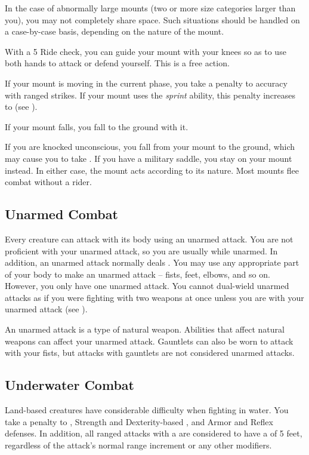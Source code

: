             In the case of abnormally large mounts (two or more size categories larger than you), you may not completely share space. Such situations should be handled on a case-by-case basis, depending on the nature of the mount.

             With a  5 Ride check, you can guide your mount with your knees so as to use both hands to attack or defend yourself. This is a free action.

            If your mount is moving in the current phase, you take a  penalty to accuracy with ranged strikes.
            If your mount uses the \textit{sprint} ability, this penalty increases to  (see ).

             If your mount falls, you fall to the ground with it.

             If you are knocked unconscious, you fall from your mount to the ground, which may cause you to take .
            If you have a military saddle, you stay on your mount instead.
            In either case, the mount acts according to its nature.
            Most mounts flee combat without a rider.

        \subsection{Unarmed Combat}\label{Unarmed Combat}
            Every creature can attack with its body using an unarmed attack.
            You are not proficient with your unarmed attack, so you are usually  while unarmed.
            In addition, an unarmed attack normally deals .
            You may use any appropriate part of your body to make an unarmed attack -- fists, feet, elbows, and so on.
            However, you only have one unarmed attack.
            You cannot dual-wield unarmed attacks as if you were fighting with two weapons at once unless you are  with your unarmed attack (see ).

            An unarmed attack is a type of natural weapon.
            Abilities that affect natural weapons can affect your unarmed attack.
            Gauntlets can also be worn to attack with your fists, but attacks with gauntlets are not considered unarmed attacks.

        \subsection{Underwater Combat}\label{Underwater Combat}
            Land-based creatures have considerable difficulty when fighting in water.
            You take a  penalty to , Strength and Dexterity-based , and Armor and Reflex defenses.
            In addition, all ranged attacks with a  are considered to have a  of 5 feet, regardless of the attack's normal range increment or any other modifiers.

